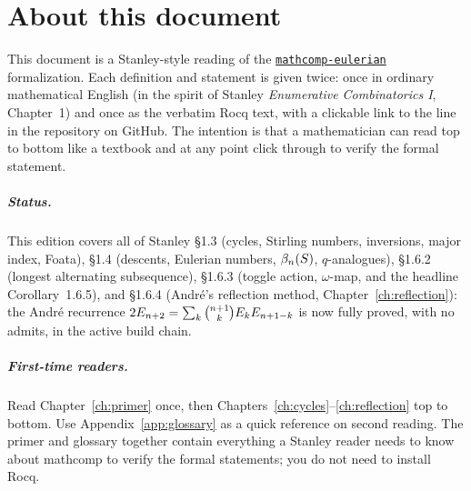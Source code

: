 



\maketitle

\tableofcontents

\chapter*{About this document}


This document is a Stanley-style reading of the
\href{https://github.com/LLM4Rocq/mathcomp-eulerian}{\texttt{mathcomp-eulerian}}
formalization. Each definition and statement is given twice: once in
ordinary mathematical English (in the spirit of Stanley
\emph{Enumerative Combinatorics I}, Chapter~1) and once as the
verbatim Rocq text, with a clickable link to the line in the
repository on GitHub. The intention is that a mathematician can read
top to bottom like a textbook and at any point click through to
verify the formal statement.

\paragraph{Status.} This edition covers all of Stanley
\S1.3 (cycles, Stirling numbers, inversions, major index, Foata),
\S1.4 (descents, Eulerian numbers, $\beta_{n}(S)$, $q$-analogues),
\S1.6.2 (longest alternating subsequence), \S1.6.3 (toggle
action, $\omega$-map, and the headline Corollary~1.6.5), and
\S1.6.4 (Andr\'e's reflection method,
Chapter~\ref{ch:reflection}): the Andr\'e recurrence
$2E_{n+2} = \sum_k \binom{n+1}{k}E_kE_{n+1-k}$ is now
fully proved, with no admits, in the active build chain.

\paragraph{First-time readers.} Read Chapter~\ref{ch:primer} once,
then Chapters~\ref{ch:cycles}--\ref{ch:reflection} top to bottom.
Use Appendix~\ref{app:glossary} as a quick reference on second
reading. The primer and glossary together contain everything a
Stanley reader needs to know about mathcomp to verify the formal
statements; you do not need to install Rocq.

